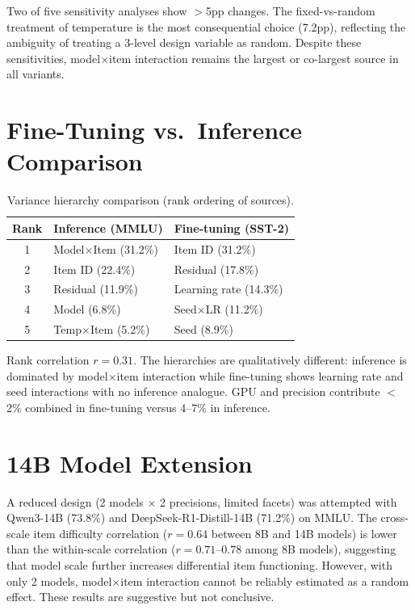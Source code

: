 \documentclass[11pt,twocolumn]{article}
\newcommand{\pct}{\%}
\begin{document}
Two of five sensitivity analyses show $>$5pp changes. The fixed-vs-random treatment of temperature is the most consequential choice (7.2pp), reflecting the ambiguity of treating a 3-level design variable as random. Despite these sensitivities, model$\times$item interaction remains the largest or co-largest source in all variants.

\section{Fine-Tuning vs.\ Inference Comparison}

\begin{table}[h]
\centering
\caption{Variance hierarchy comparison (rank ordering of sources).}
\begin{tabular}{@{}cll@{}}
\toprule
\textbf{Rank} & \textbf{Inference (MMLU)} & \textbf{Fine-tuning (SST-2)} \\
\midrule
1 & Model$\times$Item (31.2\pct{}) & Item ID (31.2\pct{}) \\
2 & Item ID (22.4\pct{})           & Residual (17.8\pct{}) \\
3 & Residual (11.9\pct{})          & Learning rate (14.3\pct{}) \\
4 & Model (6.8\pct{})              & Seed$\times$LR (11.2\pct{}) \\
5 & Temp$\times$Item (5.2\pct{})   & Seed (8.9\pct{}) \\
\bottomrule
\end{tabular}
\end{table}

Rank correlation $r=0.31$. The hierarchies are qualitatively different: inference is dominated by model$\times$item interaction while fine-tuning shows learning rate and seed interactions with no inference analogue. GPU and precision contribute $<$2\pct{} combined in fine-tuning versus 4--7\pct{} in inference.

\section{14B Model Extension}
\label{app:14b}

A reduced design (2 models $\times$ 2 precisions, limited facets) was attempted with Qwen3-14B (73.8\pct{}) and DeepSeek-R1-Distill-14B (71.2\pct{}) on MMLU. The cross-scale item difficulty correlation ($r=0.64$ between 8B and 14B models) is lower than the within-scale correlation ($r=0.71$--$0.78$ among 8B models), suggesting that model scale further increases differential item functioning. However, with only 2 models, model$\times$item interaction cannot be reliably estimated as a random effect. These results are suggestive but not conclusive.
\end{document}
